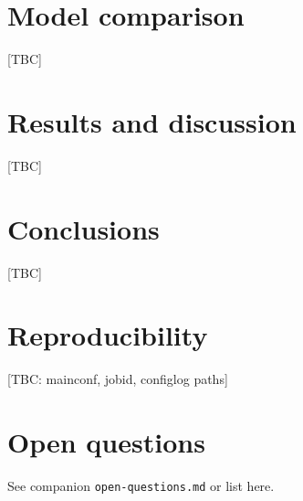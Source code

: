 \documentclass[11pt,a4paper]{article}
\begin{document}
\section{Model comparison}
[TBC]

\section{Results and discussion}
[TBC]

\section{Conclusions}
[TBC]

\appendix
\section{Reproducibility}
[TBC: mainconf, jobid, configlog paths]

\section{Open questions}
See companion \texttt{open-questions.md} or list here.
\end{document}
